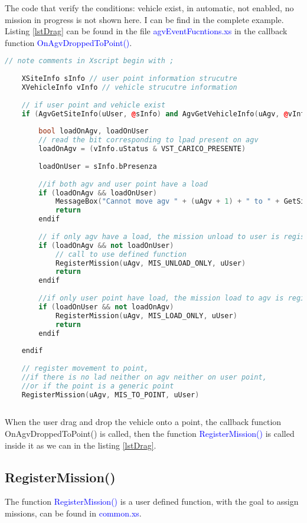 The code that verify the conditions: vehicle exist, in automatic, not enabled, no mission in progress is not shown here. I can be find in the complete example.\\

Listing \ref{lstDrag} can be found in the file \textcolor{blue}{agvEventFucntions.xs} in the callback function \textcolor{blue}{OnAgvDroppedToPoint()}.

\begin{lstlisting}[language=c++, caption= Drag and drop to user point and generic point, label=lstDrag]
	// note comments in Xscript begin with ;
	
	XSiteInfo sInfo // user point information strucutre
	XVehicleInfo vInfo // vehicle strucutre information
	
	// if user point and vehicle exist
	if (AgvGetSiteInfo(uUser, @sInfo) and AgvGetVehicleInfo(uAgv, @vInfo))
	
		bool loadOnAgv, loadOnUser
		// read the bit corresponding to lpad present on agv
		loadOnAgv = (vInfo.uStatus & VST_CARICO_PRESENTE)
		
		loadOnUser = sInfo.bPresenza
		
		//if both agv and user point have a load
		if (loadOnAgv && loadOnUser)
			MessageBox("Cannot move agv " + (uAgv + 1) + " to " + GetSiteName(uUser) + " : both have a trolley")
			return
		endif
		
		// if only agv have a load, the mission unload to user is registered
		if (loadOnAgv && not loadOnUser)
			// call to use defined function
			RegisterMission(uAgv, MIS_UNLOAD_ONLY, uUser)
			return
		endif
		
		//if only user point have load, the mission load to agv is registerd.
		if (loadOnUser && not loadOnAgv)
			RegisterMission(uAgv, MIS_LOAD_ONLY, uUser)
			return
		endif
		
	endif
	
	// register movement to point, 
	//if there is no lad neither on agv neither on user point, 
	//or if the point is a generic point
	RegisterMission(uAgv, MIS_TO_POINT, uUser)
	
\end{lstlisting}

When the user drag and drop the vehicle onto a point, the callback function {OnAgvDroppedToPoint()} is called, then the function \textcolor{blue}{RegisterMission()} is called inside it as we can in the listing \ref{lstDrag}.

\subsection*{RegisterMission()}
The function \textcolor{blue}{RegisterMission()} is a user defined function, with the goal to assign missions, can be found in \textcolor{blue}{common.xs}.

